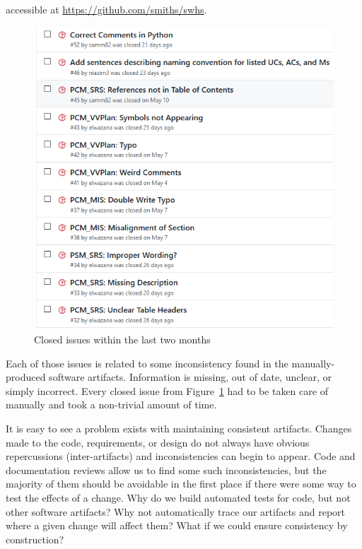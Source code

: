 \documentclass[twocolumn]{article}
\begin{document}
accessible at \url{https://github.com/smiths/swhs}.
\begin{figure}[!htbp]
  \centering
  \includegraphics[width=\linewidth]{RecentIssuesSWHS.PNG}
  \caption{Closed issues within the last two months}
  \label{Fig:ClosedIssues}
\end{figure}

Each of those issues is related to some inconsistency found in the 
manually-produced software artifacts. Information is missing, out of date, 
unclear, or simply incorrect. Every closed issue from 
Figure~\ref{Fig:ClosedIssues} had to be taken care of manually and took a 
non-trivial amount of time.

It is easy to see a problem exists with maintaining consistent artifacts. 
Changes made to the code, requirements, or design do not always have obvious 
repercussions (inter-artifacts) and inconsistencies can begin to appear. Code 
and documentation reviews allow us to find some such inconsistencies, but the 
majority of them should be avoidable in the first place if there were some way 
to test the effects of a change. Why do we build automated tests for code, but 
not other software artifacts? Why not automatically trace our 
artifacts and report where a given change will affect them? What if we could 
ensure consistency by construction?
\end{document}
